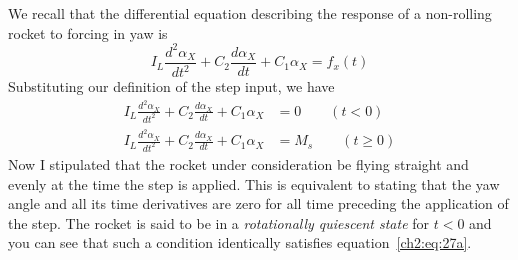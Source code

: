 We recall that the differential equation describing the response of a
non-rolling rocket to forcing in yaw is
\begin{equation*}
I_L \frac{d^{2}\alpha_X}{dt^{2}} + C_2 \frac{d\alpha_X}{dt} + C_1\alpha_X = f_x(t)
\end{equation*}
Substituting our definition of the step input, we have
\begin{subequations}\label{ch2:eq:27}
\begin{align}
I_L \frac{d^{2}\alpha_X}{dt^{2}} + C_2 \frac{d\alpha_X}{dt} + C_1\alpha_X
  &= 0 \qquad (t < 0)\label{ch2:eq:27a}\\
I_L \frac{d^{2}\alpha_X}{dt^{2}} + C_2 \frac{d\alpha_X}{dt} + C_1\alpha_X
  &= M_s \qquad (t \ge 0)\label{ch2:eq:27b}
\end{align}
\end{subequations}
Now I stipulated that the rocket under consideration be flying straight and
evenly at the time the step is applied. This is equivalent to stating that the
yaw angle and all its time derivatives are zero for all time preceding the
application of the step. The rocket is said to be in a \emph{rotationally
quiescent state} for $t < 0$ and you can see that such a condition identically
satisfies equation~\eqref{ch2:eq:27a}.

